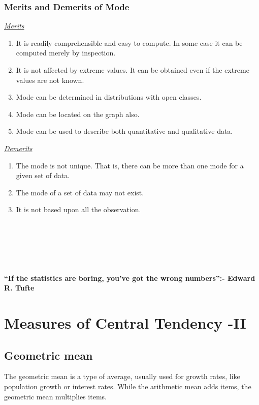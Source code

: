 \documentclass[
]{book}
\begin{document}
\subsection{Merits and Demerits of Mode}\label{merits-and-demerits-of-mode}

\ul{\emph{Merits}}

\begin{enumerate}
\def\labelenumi{\arabic{enumi}.}
\item
  It is readily comprehensible and easy to compute. In some case it
  can be computed merely by inspection.
\item
  It is not affected by extreme values. It can be obtained even if the
  extreme values are not known.
\item
  Mode can be determined in distributions with open classes.
\item
  Mode can be located on the graph also.
\item
  Mode can be used to describe both quantitative and qualitative data.
\end{enumerate}

\ul{\emph{Demerits}}

\begin{enumerate}
\def\labelenumi{\arabic{enumi}.}
\item
  The mode is not unique. That is, there can be more than one mode for
  a given set of data.
\item
  The mode of a set of data may not exist.
\item
  It is not based upon all the observation.
\end{enumerate}

~\\
\strut ~\\
\strut ~

\label{hello}
\textbf{``If the statistics are boring, you've got the wrong
numbers'':- Edward R. Tufte}

\chapter{Measures of Central Tendency -II}\label{measures-of-central-tendency--ii}

\section{Geometric mean}\label{geometric-mean}

The geometric mean is a type of average, usually used for growth rates,
like population growth or interest rates. While the arithmetic mean adds
items, the geometric mean multiplies items.
\end{document}
